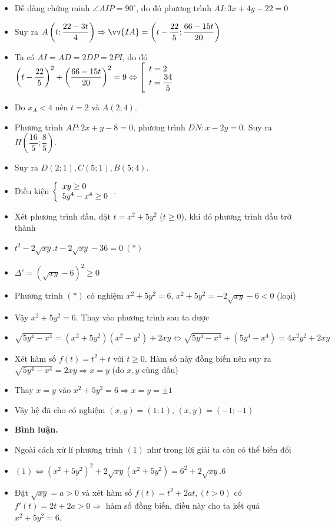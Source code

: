  \begin{itemize}[label=,leftmargin=*]
 \item Dễ dàng chứng minh $\angle AIP=90^{\circ}$, do đó phương trình $AI:3x+4y-22=0	$
 \item Suy ra $A\left(t;\dfrac{22-3t}{4} \right)\Rightarrow \vv{IA}=\left(t-\dfrac{22}{5};\dfrac{66-15t}{20} \right)$
 \item Ta có $AI=AD=2DP=2PI$, do đó $\left(t-\dfrac{22}{5} \right)^2+\left(\dfrac{66-15t}{20} \right)^2=9\Leftrightarrow \left[\begin{array}{ll}t=2 \\ t=\dfrac{34}{5}\end{array}\right.$
 \item Do $x_A<4$ nên $t=2$ và $A(2;4)$.
 \item Phương trình $AP:2x+y-8=0$, phương trình $DN:x-2y=0$. Suy ra $H\left( \dfrac{16}{5};\dfrac{8}{5}\right)$.
 \item Suy ra $D(2;1),C(5;1),B(5;4)$.
 \end{itemize}
\lgi 
\begin{itemize}[label=,leftmargin=*]
\item Điều kiện $\left\{\begin{array}{ll}xy\ge 0 \\ 5y^4-x^4\ge 0\end{array}\right.$.
\item Xét phương trình đầu, đặt $t=x^2+5y^2$ ($t\ge 0$), khi đó phương trình đầu trở thành 
\item $t^2-2\sqrt{xy}.t-2\sqrt{xy}-36=0\ (*)$ 
\item $\Delta'=(\sqrt{xy}-6)^2\ge 0$
\item Phương trình $(*)$ có nghiệm $x^2+5y^2=6$, $x^2+5y^2=-2\sqrt{xy}-6<0$ (loại)
\item Vậy $x^2+5y^2=6$. Thay vào phương trình sau ta được
\item $\sqrt{5y^4-x^4}=(x^2+5y^2)(x^2-y^2)+2xy\Leftrightarrow \sqrt{5y^4-x^4}+(5y^4-x^4)=4x^2y^2+2xy$
\item Xét hàm số $f(t)=t^2+t$ với $t\ge 0$. Hàm số này đồng biến nên suy ra $\sqrt{5y^4-x^4}=2xy\Rightarrow x=y$ (do $x,y$ cùng dấu)
\item Thay $x=y$ vào $x^2+5y^2=6\Rightarrow x=y=\pm 1$
\item Vậy hệ đã cho có nghiệm $(x,y)=(1;1)$, $(x,y)=(-1;-1)$
\item \textbf{Bình luận.}
\item Ngoài cách xử lí phương trình $(1)$ như trong lời giải ta còn có thể biến đổi
\item $(1) \Leftrightarrow (x^2+5y^2)^2+2\sqrt{xy}(x^2+5y^2)=6^2+2\sqrt{xy}.6$
\item Đặt $\sqrt{xy}=a>0$ và xét hàm số $f(t)=t^2+2at,   (t>0)$ có $f'(t)=2t+2a>0 \Rightarrow$ hàm số đồng biến, điều này cho ta kết quả $x^2+5y^2=6$.
\end{itemize}

